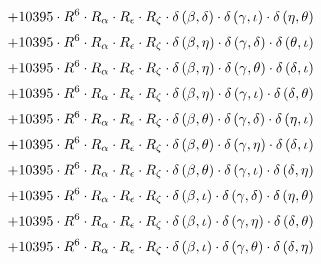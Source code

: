 \begin{subequations}
\begin{gather}
 \\[0.2em] \notag 		 + 10395 \cdot R^{6} \cdot R_{\alpha{}} \cdot R_{\epsilon{}} \cdot R_{\zeta{}} \cdot \delta{}\left(\beta{}, \delta{}\right) \cdot \delta{}\left(\gamma{}, \iota{}\right) \cdot \delta{}\left(\eta{}, \theta{}\right) 
 \\[0.2em] \notag 		 + 10395 \cdot R^{6} \cdot R_{\alpha{}} \cdot R_{\epsilon{}} \cdot R_{\zeta{}} \cdot \delta{}\left(\beta{}, \eta{}\right) \cdot \delta{}\left(\gamma{}, \delta{}\right) \cdot \delta{}\left(\theta{}, \iota{}\right) 
 \\[0.2em] \notag 		 + 10395 \cdot R^{6} \cdot R_{\alpha{}} \cdot R_{\epsilon{}} \cdot R_{\zeta{}} \cdot \delta{}\left(\beta{}, \eta{}\right) \cdot \delta{}\left(\gamma{}, \theta{}\right) \cdot \delta{}\left(\delta{}, \iota{}\right) 
 \\[0.2em] \notag 		 + 10395 \cdot R^{6} \cdot R_{\alpha{}} \cdot R_{\epsilon{}} \cdot R_{\zeta{}} \cdot \delta{}\left(\beta{}, \eta{}\right) \cdot \delta{}\left(\gamma{}, \iota{}\right) \cdot \delta{}\left(\delta{}, \theta{}\right) 
 \\[0.2em] \notag 		 + 10395 \cdot R^{6} \cdot R_{\alpha{}} \cdot R_{\epsilon{}} \cdot R_{\zeta{}} \cdot \delta{}\left(\beta{}, \theta{}\right) \cdot \delta{}\left(\gamma{}, \delta{}\right) \cdot \delta{}\left(\eta{}, \iota{}\right) 
 \\[0.2em] \notag 		 + 10395 \cdot R^{6} \cdot R_{\alpha{}} \cdot R_{\epsilon{}} \cdot R_{\zeta{}} \cdot \delta{}\left(\beta{}, \theta{}\right) \cdot \delta{}\left(\gamma{}, \eta{}\right) \cdot \delta{}\left(\delta{}, \iota{}\right) 
 \\[0.2em] \notag 		 + 10395 \cdot R^{6} \cdot R_{\alpha{}} \cdot R_{\epsilon{}} \cdot R_{\zeta{}} \cdot \delta{}\left(\beta{}, \theta{}\right) \cdot \delta{}\left(\gamma{}, \iota{}\right) \cdot \delta{}\left(\delta{}, \eta{}\right) 
 \\[0.2em] \notag 		 + 10395 \cdot R^{6} \cdot R_{\alpha{}} \cdot R_{\epsilon{}} \cdot R_{\zeta{}} \cdot \delta{}\left(\beta{}, \iota{}\right) \cdot \delta{}\left(\gamma{}, \delta{}\right) \cdot \delta{}\left(\eta{}, \theta{}\right) 
 \\[0.2em] \notag 		 + 10395 \cdot R^{6} \cdot R_{\alpha{}} \cdot R_{\epsilon{}} \cdot R_{\zeta{}} \cdot \delta{}\left(\beta{}, \iota{}\right) \cdot \delta{}\left(\gamma{}, \eta{}\right) \cdot \delta{}\left(\delta{}, \theta{}\right) 
 \\[0.2em] \notag 		 + 10395 \cdot R^{6} \cdot R_{\alpha{}} \cdot R_{\epsilon{}} \cdot R_{\zeta{}} \cdot \delta{}\left(\beta{}, \iota{}\right) \cdot \delta{}\left(\gamma{}, \theta{}\right) \cdot \delta{}\left(\delta{}, \eta{}\right) 

\end{gather}
\end{subequations}
